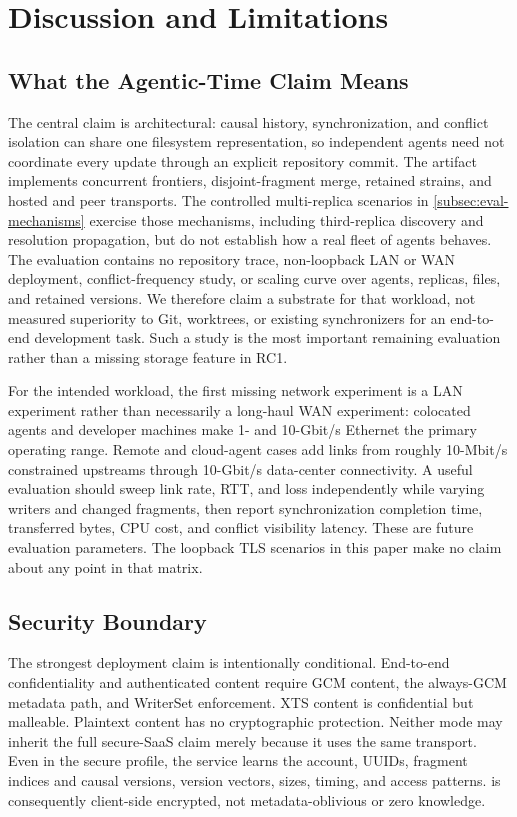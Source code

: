 \section{Discussion and Limitations}
\label{sec:discussion}

\subsection{What the Agentic-Time Claim Means}

The central claim is architectural: causal history, synchronization, and
conflict isolation can share one filesystem representation, so independent
agents need not coordinate every update through an explicit repository commit.
The artifact implements concurrent frontiers, disjoint-fragment merge, retained
strains, and hosted and peer transports.  The controlled multi-replica
scenarios in \cref{subsec:eval-mechanisms} exercise those mechanisms, including
third-replica discovery and resolution propagation, but do not establish how a
real fleet of agents behaves.  The evaluation contains no repository trace,
non-loopback LAN or WAN deployment, conflict-frequency study, or scaling curve
over agents, replicas, files, and retained versions.  We therefore claim a substrate for that
workload, not measured superiority to Git, worktrees, or existing synchronizers
for an end-to-end development task.  Such a study is the most important
remaining evaluation rather than a missing storage feature in RC1.

For the intended workload, the first missing network experiment is a LAN
experiment rather than necessarily a long-haul WAN experiment: colocated
agents and developer machines make 1- and 10-Gbit/s Ethernet the primary
operating range.  Remote and cloud-agent cases add links from roughly
10-Mbit/s constrained upstreams through 10-Gbit/s data-center connectivity.
A useful evaluation should sweep link rate, RTT, and loss independently while
varying writers and changed fragments, then report synchronization completion
time, transferred bytes, CPU cost, and conflict visibility latency.  These are
future evaluation parameters.  The loopback TLS scenarios in this paper make no
claim about any point in that matrix.

\subsection{Security Boundary}

The strongest deployment claim is intentionally conditional.  End-to-end
confidentiality and authenticated content require GCM content, the always-GCM
metadata path, and WriterSet enforcement.  XTS content is confidential but
malleable.  Plaintext content has no cryptographic protection.  Neither mode may
inherit the full secure-SaaS claim merely because it uses the same transport.
Even in the secure profile, the service learns the account, UUIDs, fragment
indices and causal versions, version vectors, sizes, timing, and access
patterns.  \sfs{} is consequently client-side encrypted, not metadata-oblivious
or zero knowledge.

